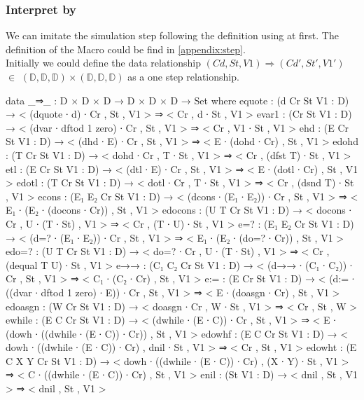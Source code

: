 \subsubsection{Interpret by \Agda}
We can imitate the simulation step following the definition using \Agda at first.
The definition of the  Macro could be find in \ref{appendix:step}.\\
Initially we could define the data relationship $(Cd,St,V1)\Rightarrow(Cd',St',V1')$ $\in$  $(\mathds{D},\mathds{D},\mathds{D})\times (\mathds{D},\mathds{D},\mathds{D})$ as a one step relationship.
\begin{code}[fontsize=\footnotesize]
data _⇒_ : D × D × D → D × D × D → Set where
  equote  : (d Cr St V1 : D)
            → < (dquote ∙ d) ∙ Cr , St , V1 >
            ⇒ < Cr , d ∙ St , V1 >
  evar1   : (Cr St V1 : D)
            → < (dvar ∙ dftod {1} zero) ∙ Cr , St , V1 >
            ⇒ < Cr , V1 ∙ St , V1 >
  ehd     : (E Cr St V1 : D)
            → < (dhd ∙ E) ∙ Cr , St , V1 >
            ⇒ < E ∙ (dohd ∙ Cr) , St , V1 >
  edohd   : (T Cr St V1 : D)
            → < dohd ∙ Cr , T ∙ St , V1 >
            ⇒ < Cr , (dfst T) ∙ St , V1 >
  etl     : (E Cr St V1 : D)
            → < (dtl ∙ E) ∙ Cr , St , V1 >
            ⇒ < E ∙ (dotl ∙ Cr) , St , V1 >
  edotl   : (T Cr St V1 : D)
            → < dotl ∙ Cr , T ∙ St , V1 >
            ⇒ < Cr , (dsnd T) ∙ St , V1 >
  econs   : (E₁ E₂ Cr St V1 : D)
            → < (dcons ∙ (E₁ ∙ E₂)) ∙ Cr , St , V1 >
            ⇒ < E₁ ∙ (E₂ ∙ (docons ∙ Cr)) , St , V1 >
  edocons : (U T Cr St V1 : D)
            → < docons ∙ Cr , U ∙ (T ∙ St) , V1 >
            ⇒ < Cr , (T ∙ U) ∙ St , V1 >
  e=?     : (E₁ E₂ Cr St V1 : D)
            → < (d=? ∙ (E₁ ∙ E₂)) ∙ Cr , St , V1 >
            ⇒ < E₁ ∙ (E₂ ∙ (do=? ∙ Cr)) , St , V1 >
  edo=?   : (U T Cr St V1 : D)
            → < do=? ∙ Cr , U ∙ (T ∙ St) , V1 >
            ⇒ < Cr , (dequal T U) ∙ St , V1 >
  e→→     : (C₁ C₂ Cr St V1 : D)
            → < (d→→ ∙ (C₁ ∙ C₂)) ∙ Cr , St , V1 >
            ⇒ < C₁ ∙ (C₂ ∙ Cr) , St , V1 >
  e:=     : (E Cr St V1 : D)
            → < (d:= ∙ ((dvar ∙ dftod {1} zero) ∙ E)) ∙ Cr , St , V1 >
            ⇒ < E ∙ (doasgn ∙ Cr) , St , V1 >
  edoasgn : (W Cr St V1 : D)
            → < doasgn ∙ Cr , W ∙ St , V1 >
            ⇒ < Cr , St , W >
  ewhile  : (E C Cr St V1 : D)
            → < (dwhile ∙ (E ∙ C)) ∙ Cr , St , V1 >
            ⇒ < E ∙ (dowh ∙ ((dwhile ∙ (E ∙ C)) ∙ Cr)) , St , V1 >
  edowhf  : (E C Cr St V1 : D)
            → < dowh ∙ ((dwhile ∙ (E ∙ C)) ∙ Cr) , dnil ∙ St , V1 >
            ⇒ < Cr , St , V1 >
  edowht  : (E C X Y Cr St V1 : D)
            → < dowh ∙ ((dwhile ∙ (E ∙ C)) ∙ Cr) , (X ∙ Y) ∙ St , V1 >
            ⇒ <  C ∙ ((dwhile ∙ (E ∙ C)) ∙ Cr)  , St , V1 >
  enil    : (St V1 : D) → < dnil , St , V1 > ⇒ < dnil , St , V1 >
\end{code}
